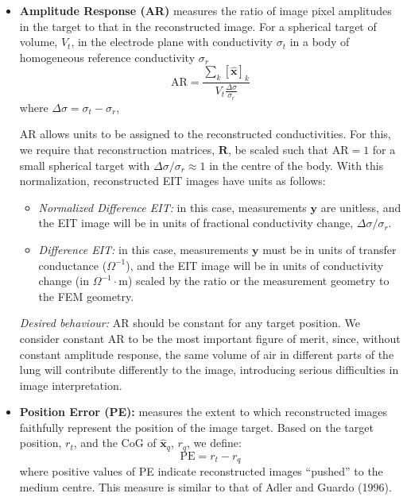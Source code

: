 \documentclass[12pt]{iopart}
\newcommand{\xH}{\mbox{$\mathbf{\hat x}$}}
\newcommand{\yB}{\mbox{$\mathbf{y}$}}
\newcommand{\RB}{\mbox{$\mathbf{R}$}}
\begin{document}
\begin{itemize}

\item
{\bf Amplitude Response (AR)}
measures the ratio of image pixel amplitudes in the
target to that in the reconstructed image.
For a spherical target of volume, $V_t$, in the electrode
plane with
conductivity $\sigma_t$ in a body of homogeneous reference
conductivity $\sigma_r$
\begin{equation}
\mathrm{AR} =  \frac{
    \sum_k [\xH]_k
  }{
    V_t \frac{\Delta\sigma}{\sigma_r}
  }
\end{equation}
where $\Delta\sigma = \sigma_t - \sigma_r$,

\hspace{5mm}
AR allows units to be assigned to the 
reconstructed conductivities. For this, we 
require that reconstruction matrices, $\RB$, be
scaled such that AR$=1$ for 
a small spherical target with
 $\Delta\sigma/\sigma_r \approx 1$
in the centre of the body.
With this normalization, reconstructed EIT images have
units as follows:
   \begin{itemize}
   \item {\em Normalized Difference EIT:}
in this case, measurements $\yB$ are unitless,
and the EIT image will be in units of fractional conductivity
change, $\Delta\sigma/\sigma_r$.
   \item {\em Difference EIT:}
in this case, measurements $\yB$ must be in units of
transfer conductance ($\Omega^{-1}$), and the EIT image
will be in units of conductivity change (in $\Omega^{-1}\cdot$m)
scaled by the ratio or the measurement geometry to
the FEM geometry.
   \end{itemize}


\hspace{5mm}
{\em Desired behaviour:}
AR should be constant for any target position. We consider
constant
AR to be the most important figure of merit, since, without
constant amplitude response, the same volume of air in different parts
of the lung will contribute differently to the image, introducing
serious difficulties in image interpretation.

\item
{\bf Position Error (PE):}
measures the extent to which reconstructed images faithfully
represent the position of the image target. Based on the
target position, $r_t$, and the CoG of $\xH_q$, $r_q$, we define:
\begin{equation}
\mathrm{PE} = r_t - r_q
\end{equation}
where positive values of PE indicate reconstructed images
``pushed'' to the medium centre. This measure is similar
to that of Adler and Guardo (1996).


\end{itemize}
\end{document}
